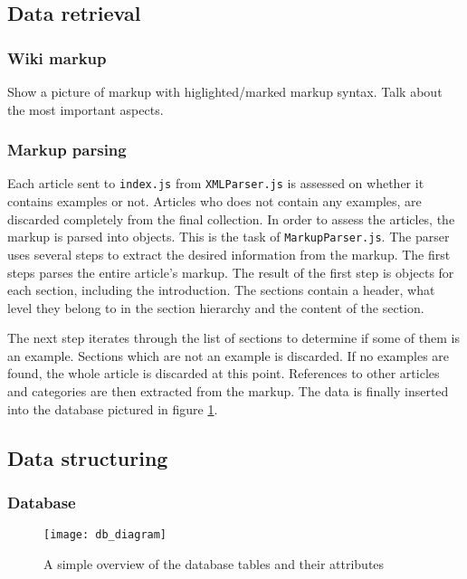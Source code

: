 \subsection{Data retrieval}


\subsubsection{Wiki markup}
Show a picture of markup with higlighted/marked markup syntax. Talk about the most important aspects.

\subsubsection{Markup parsing}
Each article sent to \texttt{index.js} from \texttt{XMLParser.js} is assessed on whether it contains examples or not. Articles who does not contain any examples, are discarded completely from the final collection. In order to assess the articles, the markup is parsed into objects. This is the task of \texttt{MarkupParser.js}. The parser uses several steps to extract the desired information from the markup. The first steps parses the entire article's markup. The result of the first step is objects for each section, including the introduction. The sections contain a header, what level they belong to in the section hierarchy and the content of the section. 

The next step iterates through the list of sections to determine if some of them is an example. Sections which are not an example is discarded. If no examples are found, the whole article is discarded at this point. References to other articles and categories are then extracted from the markup. The data is finally inserted into the database pictured in figure \ref{fig:db_diagram}.



\subsection{Data structuring}

\subsubsection{Database}

\begin{figure}[h] 
\caption{A simple overview of the database tables and their attributes}
\texttt{[image: db\_diagram]}
\label{fig:db_diagram}
\end{figure}

